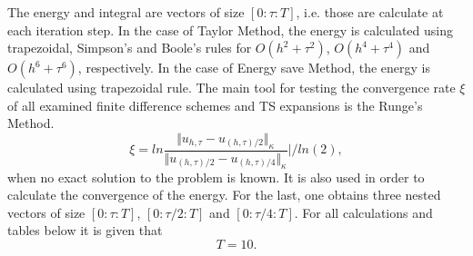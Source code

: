 \documentclass{article}
\begin{document}
The energy and integral are vectors of size $[0:\tau:T]$, i.e. those are calculate at each iteration step. In the case of Taylor Method, the energy is calculated using trapezoidal, Simpson's and Boole's rules for $O(h^{2} + \tau^2 )$, $O(h^{4} + \tau^4 )$ and $O(h^{6} + \tau^6 )$, respectively. In the case of Energy save Method, the energy is calculated using trapezoidal rule. The main tool for testing the convergence rate $\xi$ of all examined finite difference schemes and TS expansions is the Runge's Method. 
\begin{equation}\label{Runge}
\xi = ln  \frac{\Vert u_{h,\tau} - u_{(h,\tau)/2} \Vert_\kappa } {\Vert  u_{(h,\tau)/2} - u_{(h,\tau)/4} \Vert_\kappa  } | / ln(2),
\end{equation}
when no exact solution to the problem is known. It is also used in order to calculate the convergence of the energy. For the last, one obtains three nested vectors of size $[0:\tau:T]$, $[0:\tau/2:T]$ and $[0:\tau/4:T]$. For all calculations and tables below it is given that $$T=10.$$
\end{document}
